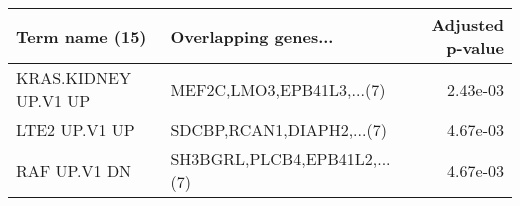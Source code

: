 \begin{tabular}{llr}
\toprule
      Term name (15) &         Overlapping genes... &  Adjusted p-value \\
\midrule
KRAS.KIDNEY UP.V1 UP &    MEF2C,LMO3,EPB41L3,...(7) &          2.43e-03 \\
       LTE2 UP.V1 UP &    SDCBP,RCAN1,DIAPH2,...(7) &          4.67e-03 \\
        RAF UP.V1 DN & SH3BGRL,PLCB4,EPB41L2,...(7) &          4.67e-03 \\
\bottomrule
\end{tabular}

